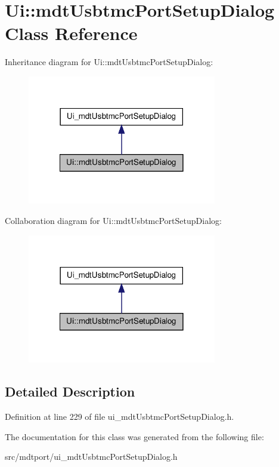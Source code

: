 \hypertarget{class_ui_1_1mdt_usbtmc_port_setup_dialog}{
\section{Ui::mdtUsbtmcPortSetupDialog Class Reference}
\label{class_ui_1_1mdt_usbtmc_port_setup_dialog}
}


Inheritance diagram for Ui::mdtUsbtmcPortSetupDialog:
\nopagebreak
\begin{figure}[H]
\begin{center}
\leavevmode
\includegraphics[width=234pt]{class_ui_1_1mdt_usbtmc_port_setup_dialog__inherit__graph}
\end{center}
\end{figure}


Collaboration diagram for Ui::mdtUsbtmcPortSetupDialog:
\nopagebreak
\begin{figure}[H]
\begin{center}
\leavevmode
\includegraphics[width=234pt]{class_ui_1_1mdt_usbtmc_port_setup_dialog__coll__graph}
\end{center}
\end{figure}


\subsection{Detailed Description}


Definition at line 229 of file ui\_\-mdtUsbtmcPortSetupDialog.h.



The documentation for this class was generated from the following file:\begin{DoxyCompactItemize}
\item 
src/mdtport/ui\_\-mdtUsbtmcPortSetupDialog.h\end{DoxyCompactItemize}
